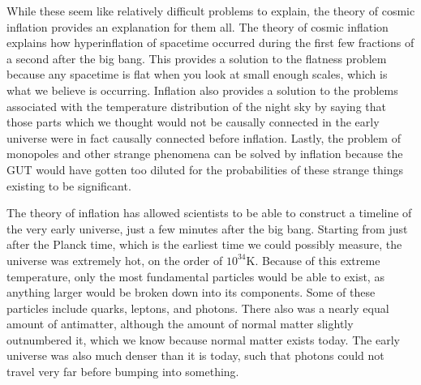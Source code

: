\documentclass[12pt]{article}
\begin{document}
While these seem like relatively difficult problems to explain, the theory of
cosmic inflation provides an explanation for them all.  The theory of cosmic
inflation explains how hyperinflation of spacetime occurred during the first few
fractions of a second after the big bang.  This provides a solution to the
flatness problem because any spacetime is flat when you look at small enough
scales, which is what we believe is occurring.  Inflation also provides a
solution to the problems associated with the temperature distribution of the
night sky by saying that those parts which we thought would not be causally
connected in the early universe were in fact causally connected before
inflation.  Lastly, the problem of monopoles and other strange phenomena can be
solved by inflation because the GUT would have gotten too diluted for the
probabilities of these strange things existing to be significant.



The theory of inflation has allowed scientists to be able to construct a
timeline of the very early universe, just a few minutes after the big bang.
Starting from just after the Planck time, which is the earliest time we could
possibly measure, the universe was extremely hot, on the order of $10^{34}$K.
Because of this extreme temperature, only the most fundamental particles would
be able to exist, as anything larger would be broken down into its components.
Some of these particles include quarks, leptons, and photons. There also was a
nearly equal amount of antimatter, although the amount of normal matter slightly
outnumbered it, which we know because normal matter exists today.  The early
universe was also much denser than it is today, such that photons could not
travel very far before bumping into something.
\end{document}
